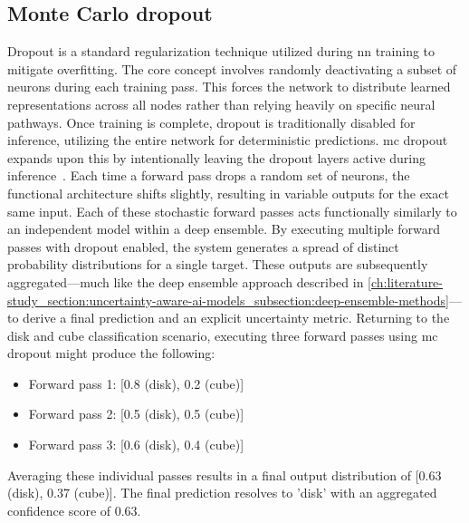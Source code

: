 \subsection{Monte Carlo dropout} \label{ch:literature-study_section:uncertainty-aware-ai-models_subsection:monte-carlo-dropout}
Dropout is a standard regularization technique utilized during \gls{nn} training to mitigate overfitting.
The core concept involves randomly deactivating a subset of neurons during each training pass.
This forces the network to distribute learned representations across all nodes rather than relying heavily on specific neural pathways.
Once training is complete, dropout is traditionally disabled for inference, utilizing the entire network for deterministic predictions.
\gls{mc} dropout expands upon this by intentionally leaving the dropout layers active during inference~\cite{src:mc-dropout}.
Each time a forward pass drops a random set of neurons, the functional architecture shifts slightly, resulting in variable outputs for the exact same input.
Each of these stochastic forward passes acts functionally similarly to an independent model within a deep ensemble.
By executing multiple forward passes with dropout enabled, the system generates a spread of distinct probability distributions for a single target.
These outputs are subsequently aggregated—much like the deep ensemble approach described in \cref{ch:literature-study_section:uncertainty-aware-ai-models_subsection:deep-ensemble-methods}—to derive a final prediction and an explicit uncertainty metric.
Returning to the disk and cube classification scenario, executing three forward passes using \gls{mc} dropout might produce the following:
\begin{itemize}
    \item Forward pass 1: [0.8 (disk), 0.2 (cube)]
    \item Forward pass 2: [0.5 (disk), 0.5 (cube)]
    \item Forward pass 3: [0.6 (disk), 0.4 (cube)]
\end{itemize}
Averaging these individual passes results in a final output distribution of [0.63 (disk), 0.37 (cube)].
The final prediction resolves to 'disk' with an aggregated confidence score of 0.63.